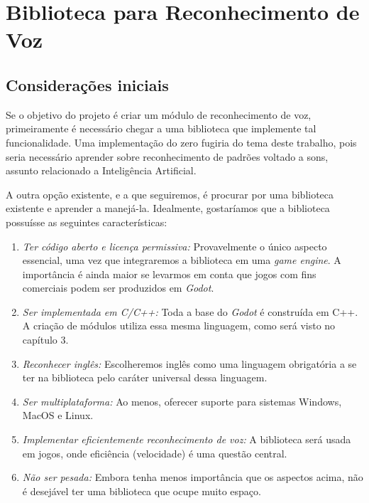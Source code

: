 \chapter{Biblioteca para Reconhecimento de Voz}
\label{cap:speech-libs}


\section{Considerações iniciais}

Se o objetivo do projeto é criar um módulo de reconhecimento de voz, primeiramente é necessário chegar a uma biblioteca que implemente tal funcionalidade. Uma implementação do zero fugiria do tema deste trabalho, pois seria necessário aprender sobre reconhecimento de padrões voltado a sons, assunto relacionado a Inteligência Artificial.

A outra opção existente, e a que seguiremos, é procurar por uma biblioteca existente e aprender a manejá-la. Idealmente, gostaríamos que a biblioteca possuísse as seguintes características:

\begin{enumerate}
\item \emph{Ter código aberto e licença permissiva:} Provavelmente o único aspecto essencial, uma vez que integraremos a biblioteca em uma \emph{game engine}. A importância é ainda maior se levarmos em conta que jogos com fins comerciais podem ser produzidos em \emph{Godot}.

\item \emph{Ser implementada em C/C++:} Toda a base do \emph{Godot} é construída em C++. A criação de módulos utiliza essa mesma linguagem, como será visto no capítulo 3.

\item \emph{Reconhecer inglês:} Escolheremos inglês como uma linguagem obrigatória a se ter na biblioteca pelo caráter universal dessa linguagem.

\item \emph{Ser multiplataforma:} Ao menos, oferecer suporte para sistemas Windows, MacOS e Linux.

\item \emph{Implementar eficientemente reconhecimento de voz:} A biblioteca será usada em jogos, onde eficiência (velocidade) é uma questão central.

\item \emph{Não ser pesada:} Embora tenha menos importância que os aspectos acima, não é desejável ter uma biblioteca que ocupe muito espaço.
\end{enumerate}

